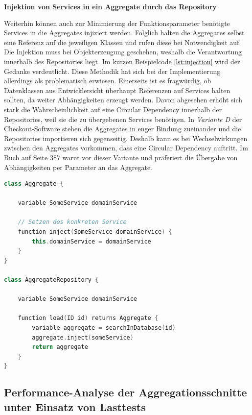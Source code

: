 \textbf{Injektion von Services in ein Aggregate durch das Repository}

Weiterhin können auch zur Minimierung der Funktionsparameter benötigte Services in die Aggregates injiziert werden. Folglich halten die Aggregates selbst eine Referenz auf die jeweiligen Klassen und rufen diese bei Notwendigkeit auf. Die Injektion muss bei Objekterzeugung geschehen, weshalb die Verantwortung innerhalb des Repositories liegt. Im kurzen Beispielcode \ref{lst:injection} wird der Gedanke verdeutlicht. Diese Methodik hat sich bei der Implementierung allerdings als problematisch erwiesen. Einerseits ist es fragwürdig, ob Datenklassen aus Entwicklersicht überhaupt Referenzen auf Services halten sollten, da weiter Abhängigkeiten erzeugt werden. Davon abgesehen erhöht sich stark die Wahrscheinlichkeit auf eine Circular Dependency innerhalb der Repositories, weil sie die zu übergebenen Services benötigen. In \emph{Variante D} der Checkout-Software stehen die Aggregates in enger Bindung zueinander und die Repositories importieren sich gegenseitig. Deshalb kann es bei Wechselwirkungen zwischen den Aggregates vorkommen, dass eine Circular Dependency auftritt. Im Buch  auf Seite 387 warnt \citeauthor{Vernon.2015} vor dieser Variante und präferiert die Übergabe von Abhängigkeiten per Parameter an das Aggregate.

\begin{minipage}{\linewidth} %
	\begin{lstlisting}[caption={Injektion eines Services in ein Aggregate durch das Repository}, label={lst:injection}, language=Kotlin]
class Aggregate {
	
	variable SomeService domainService
	
	// Setzen des konkreten Service
	function inject(SomeService domainService) {
		this.domainService = domainService
	}
}

class AggregateRepository {
	
	variable SomeService domainService
	
	function load(ID id) returns Aggregate {
		variable aggregate = searchInDatabase(id)
		aggregate.inject(someService)
		return aggregate
	}
}
	\end{lstlisting}
\end{minipage}


\subsection{Performance-Analyse der Aggregationsschnitte unter Einsatz von Lasttests}

